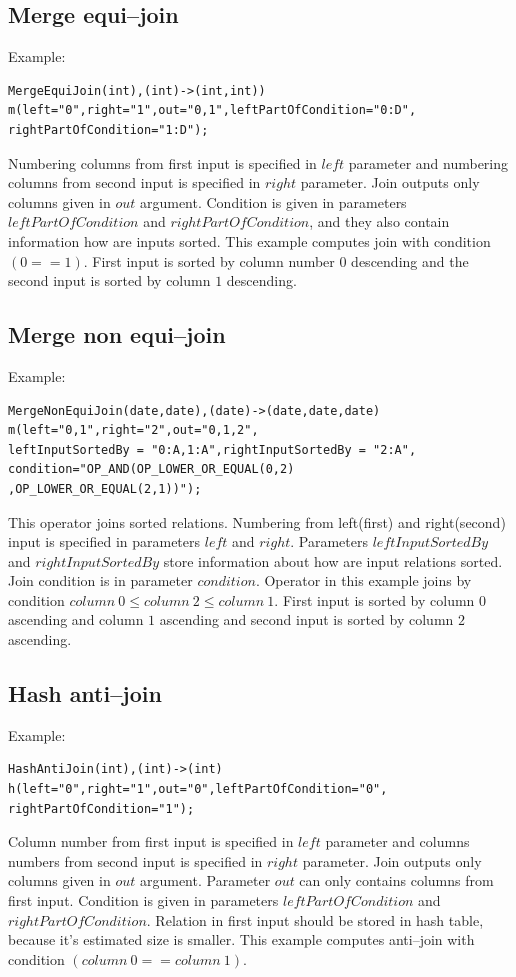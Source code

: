 \subsection{Merge equi--join}
Example:
\begin{lstlisting}
MergeEquiJoin(int),(int)->(int,int))
m(left="0",right="1",out="0,1",leftPartOfCondition="0:D",
rightPartOfCondition="1:D");
\end{lstlisting}
Numbering columns from first input is specified in $left$ parameter and numbering columns from second input is specified in $right$ parameter. Join outputs only columns given in $out$ argument. Condition is given in parameters $leftPartOfCondition$ and $rightPartOfCondition$, and they also contain information how are inputs sorted. This example computes join with condition $(0==1)$. First input is sorted by column number $0$ descending and the second input is sorted by column $1$ descending.

\subsection{Merge non equi--join}
Example:
\begin{lstlisting}
MergeNonEquiJoin(date,date),(date)->(date,date,date)
m(left="0,1",right="2",out="0,1,2",
leftInputSortedBy = "0:A,1:A",rightInputSortedBy = "2:A",
condition="OP_AND(OP_LOWER_OR_EQUAL(0,2)
,OP_LOWER_OR_EQUAL(2,1))");
\end{lstlisting}

This operator joins sorted relations. Numbering from left(first) and right(second) input is specified in parameters $left$ and $right$. Parameters $leftInputSortedBy$ and $rightInputSortedBy$ store information about how are input relations sorted. Join condition is in parameter $condition$. Operator in this example joins by condition $column~0 \leq column~2\leq column~1$. First input is sorted by column $0$ ascending and column $1$ ascending and second input is sorted by column $2$ ascending.

\subsection{Hash anti--join}
Example:
\begin{lstlisting}
HashAntiJoin(int),(int)->(int)
h(left="0",right="1",out="0",leftPartOfCondition="0",
rightPartOfCondition="1"); 
\end{lstlisting}

Column number from first input is specified in $left$ parameter and columns numbers from second input is specified in $right$ parameter. Join outputs only columns given in $out$ argument. Parameter $out$ can only contains columns from first input. Condition is given in parameters $leftPartOfCondition$ and $rightPartOfCondition$.
Relation in first input should be stored in hash table, because it's estimated size is smaller. This example computes anti--join with condition $(column~0==column~1)$.

